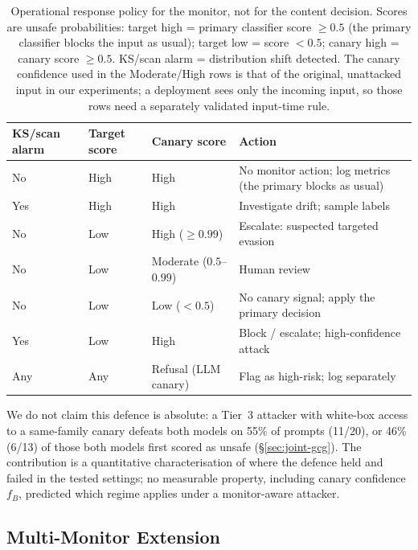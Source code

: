 \documentclass{article}
\begin{document}
\begin{table}[h]
\centering
\small
\caption{Operational response policy for the monitor, not for the content decision. Scores are unsafe probabilities: target high = primary classifier score $\geq 0.5$ (the primary classifier blocks the input as usual); target low = score $< 0.5$; canary high = canary score $\geq 0.5$. KS/scan alarm = distribution shift detected. The canary confidence used in the Moderate/High rows is that of the original, unattacked input in our experiments; a deployment sees only the incoming input, so those rows need a separately validated input-time rule.}
\label{tab:ops}
\begin{tabular}{lllp{}}
\toprule
\textbf{KS/scan alarm} & \textbf{Target score} & \textbf{Canary score} & \textbf{Action} \\
\midrule
No  & High & High & No monitor action; log metrics (the primary blocks as usual) \\
Yes & High & High & Investigate drift; sample labels \\
No  & Low  & High ($\geq 0.99$) & Escalate: suspected targeted evasion \\
No  & Low  & Moderate ($0.5$--$0.99$) & Human review \\
No  & Low  & Low ($< 0.5$) & No canary signal; apply the primary decision \\
Yes & Low  & High & Block / escalate; high-confidence attack \\
Any & Any  & Refusal (LLM canary) & Flag as high-risk; log separately \\
\bottomrule
\end{tabular}
\end{table}

We do not claim this defence is absolute: a Tier~3 attacker with white-box access to a same-family canary defeats both models on 55\% of prompts (11/20), or 46\% (6/13) of those both models first scored as unsafe (\S\ref{sec:joint-gcg}). The contribution is a quantitative characterisation of where the defence held and failed in the tested settings; no measurable property, including canary confidence $f_B$, predicted which regime applies under a monitor-aware attacker.




\subsection{Multi-Monitor Extension}
\label{sec:game-theory}
\end{document}
